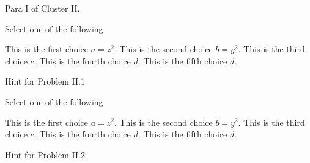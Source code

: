 \begin{cluster}[Cluster I]
\begin{gram}
Para I of Cluster II.
\end{gram}

\begin{flex}
\begin{problem}
Select one of the following
\begin{pickone}[20]
\choice This is the first choice $a = z^2$.
\choice This is the second choice $b = y^2$.
\correctchoice This is the third choice $c$.
\correctchoice This is the fourth choice $d$.
\choice This is the fifth choice $d$.
\end{pickone}

\end{problem}

\begin{hint}
Hint  for Problem II.1
\end{hint}
\end{flex}

\begin{flex}
\begin{problem}
Select one of the following
\begin{pickany}
\choice This is the first choice $a = z^2$.
\choice This is the second choice $b = y^2$.
\correctchoice This is the third choice $c$.
\correctchoice This is the fourth choice $d$.
\choice This is the fifth choice $d$.
\end{pickany}

\end{problem}

\begin{hint}
Hint  for Problem II.2
\end{hint}
\end{flex}
\end{cluster}

